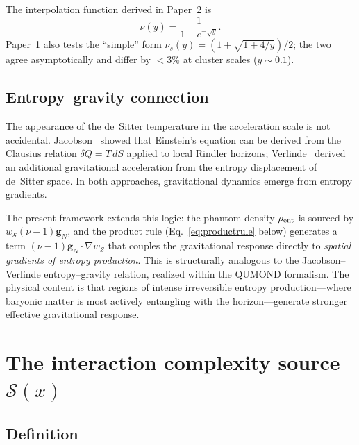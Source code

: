 \documentclass[aps,prd,twocolumn,superscriptaddress,nofootinbib]{revtex4-2}
\newcommand{\gN}{\bm{g}_N}
\newcommand{\rhoent}{\rho_{\rm ent}}
\newcommand{\wS}{w_{\mathcal{S}}}
\newcommand{\Ssrc}{\mathcal{S}}
\begin{document}
The interpolation function derived in Paper~2 is
\begin{equation}
\nu(y)=\frac{1}{1-e^{-\sqrt{y}}}.
\label{eq:nu}
\end{equation}
Paper~1 also tests the ``simple'' form $\nu_s(y)=(1+\sqrt{1+4/y})/2$; the two agree asymptotically and differ by $<3\%$ at cluster scales ($y\sim 0.1$).

\subsection{Entropy--gravity connection}

The appearance of the de~Sitter temperature in the acceleration scale is not accidental. Jacobson~\cite{Jacobson1995} showed that Einstein's equation can be derived from the Clausius relation $\delta Q = T\,dS$ applied to local Rindler horizons; Verlinde~\cite{Verlinde2016} derived an additional gravitational acceleration from the entropy displacement of de~Sitter space. In both approaches, gravitational dynamics emerge from entropy gradients.

The present framework extends this logic: the phantom density $\rhoent$ is sourced by $\wS(\nu-1)\gN$, and the product rule (Eq.~\ref{eq:productrule} below) generates a term $(\nu-1)\gN\cdot\nabla\wS$ that couples the gravitational response directly to \emph{spatial gradients of entropy production}. This is structurally analogous to the Jacobson--Verlinde entropy--gravity relation, realized within the QUMOND formalism. The physical content is that regions of intense irreversible entropy production---where baryonic matter is most actively entangling with the horizon---generate stronger effective gravitational response.

\section{The interaction complexity source $\Ssrc(x)$}
\label{sec:complexity}

\subsection{Definition}
\end{document}
